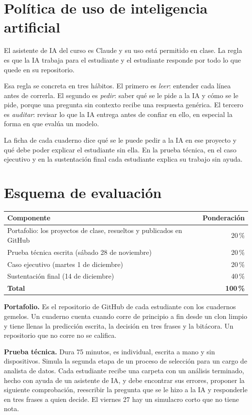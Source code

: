 \documentclass[12pt,letterpaper]{article}
\begin{document}
\section{Política de uso de inteligencia artificial}
El asistente de IA del curso es Claude y su uso está permitido en clase. La regla es que la IA trabaja para el estudiante y el estudiante responde por todo lo que quede en su repositorio.

Esa regla se concreta en tres hábitos. El primero es \emph{leer}: entender cada línea antes de correrla. El segundo es \emph{pedir}: saber qué se le pide a la IA y cómo se le pide, porque una pregunta sin contexto recibe una respuesta genérica. El tercero es \emph{auditar}: revisar lo que la IA entrega antes de confiar en ello, en especial la forma en que evalúa un modelo.

La ficha de cada cuaderno dice qué se le puede pedir a la IA en ese proyecto y qué debe poder explicar el estudiante sin ella. En la prueba técnica, en el caso ejecutivo y en la sustentación final cada estudiante explica su trabajo sin ayuda.

\section{Esquema de evaluación}
\begin{table}[h!]
\centering
\begin{tabularx}{\textwidth}{Xr}
\toprule
\textbf{Componente} & \textbf{Ponderación}\\
\midrule
Portafolio: los proyectos de clase, resueltos y publicados en GitHub & 20\,\%\\
Prueba técnica escrita (sábado 28 de noviembre) & 20\,\%\\
Caso ejecutivo (martes 1 de diciembre) & 20\,\%\\
Sustentación final (14 de diciembre) & 40\,\%\\
\midrule
\textbf{Total} & \textbf{100\,\%}\\
\bottomrule
\end{tabularx}
\end{table}

\textbf{Portafolio.} Es el repositorio de GitHub de cada estudiante con los cuadernos gemelos. Un cuaderno cuenta cuando corre de principio a fin desde un clon limpio y tiene llenas la predicción escrita, la decisión en tres frases y la bitácora. Un repositorio que no corre no se califica.

\textbf{Prueba técnica.} Dura 75 minutos, es individual, escrita a mano y sin dispositivos. Simula la segunda etapa de un proceso de selección para un cargo de analista de datos. Cada estudiante recibe una carpeta con un análisis terminado, hecho con ayuda de un asistente de IA, y debe encontrar sus errores, proponer la siguiente comprobación, reescribir la pregunta que se le hizo a la IA y responderle en tres frases a quien decide. El viernes 27 hay un simulacro corto que no tiene nota.
\end{document}
